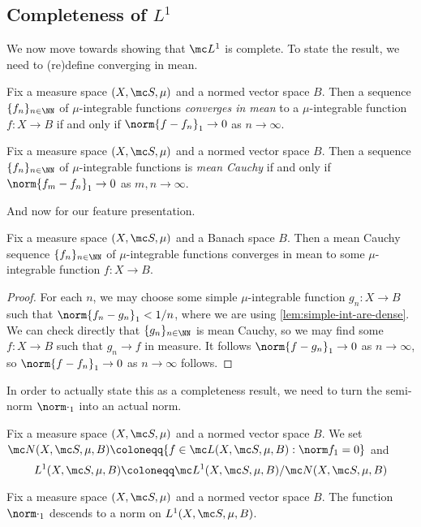 \documentclass[../notes.tex]{subfiles}
\begin{document}
\subsection{Completeness of \texorpdfstring{$L^1$}{ L1}}
We now move towards showing that $\mc L^1$ is complete. To state the result, we need to (re)define converging in mean.
\begin{definition}
	Fix a measure space $(X,\mc S,\mu)$ and a normed vector space $B$. Then a sequence $\{f_n\}_{n\in\NN}$ of $\mu$-integrable functions \textit{converges in mean} to a $\mu$-integrable function $f\colon X\to B$ if and only if $\norm{f-f_n}_1\to0$ as $n\to\infty$.
\end{definition}
\begin{definition}
	Fix a measure space $(X,\mc S,\mu)$ and a normed vector space $B$. Then a sequence $\{f_n\}_{n\in\NN}$ of $\mu$-integrable functions is \textit{mean Cauchy} if and only if $\norm{f_m-f_n}_1\to0$ as $m,n\to\infty$.
\end{definition}
And now for our feature presentation.
\begin{proposition} \label{prop:l1-complete}
	Fix a measure space $(X,\mc S,\mu)$ and a Banach space $B$. Then a mean Cauchy sequence $\{f_n\}_{n\in\NN}$ of $\mu$-integrable functions converges in mean to some $\mu$-integrable function $f\colon X\to B$.
\end{proposition}
\begin{proof}
	For each $n$, we may choose some simple $\mu$-integrable function $g_n\colon X\to B$ such that $\norm{f_n-g_n}_1<1/n$, where we are using \autoref{lem:simple-int-are-dense}. We can check directly that $\{g_n\}_{n\in\NN}$ is mean Cauchy, so we may find some $f\colon X\to B$ such that $g_n\to f$ in measure. It follows $\norm{f-g_n}_1\to0$ as $n\to\infty$, so $\norm{f-f_n}_1\to0$ as $n\to\infty$ follows.
\end{proof}
In order to actually state this as a completeness result, we need to turn the semi-norm $\norm\cdot_1$ into an actual norm.
\begin{notation}
	Fix a measure space $(X,\mc S,\mu)$ and a normed vector space $B$. We set $\mc N(X,\mc S,\mu,B)\coloneqq\{f\in\mc L(X,\mc S,\mu,B):\norm f_1=0\}$ and
	\[L^1(X,\mc S,\mu,B)\coloneqq\mc L^1(X,\mc S,\mu,B)/\mc N(X,\mc S,\mu,B)\]
\end{notation}
\begin{lemma}
	Fix a measure space $(X,\mc S,\mu)$ and a normed vector space $B$. The function $\norm\cdot_1$ descends to a norm on $L^1(X,\mc S,\mu,B)$.
\end{lemma}
\end{document}

